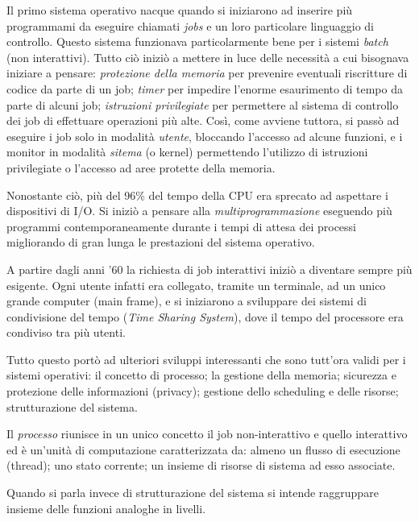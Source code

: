 Il primo sistema operativo nacque quando si iniziarono ad inserire più programmami da eseguire chiamati \textit{jobs} e un loro particolare linguaggio di controllo. Questo sistema funzionava particolarmente bene per i sistemi \textit{batch} (non interattivi). Tutto ciò iniziò a mettere in luce delle necessità a cui bisognava iniziare a pensare: \textit{protezione della memoria} per prevenire eventuali riscritture di codice da parte di un job; \textit{timer} per impedire l'enorme esaurimento di tempo da parte di alcuni job; \textit{istruzioni privilegiate} per permettere al sistema di controllo dei job di effettuare operazioni più alte. Così, come avviene tuttora, si passò ad eseguire i job solo in modalità \textit{utente}, bloccando l'accesso ad alcune funzioni, e i monitor in modalità \textit{sitema} (o kernel) permettendo l'utilizzo di istruzioni privilegiate o l'accesso ad aree protette della memoria.

Nonostante ciò, più del 96\% del tempo della CPU era sprecato ad aspettare i dispositivi di I/O. Si iniziò a pensare alla \textit{multiprogrammazione} eseguendo più programmi contemporaneamente durante i tempi di attesa dei processi migliorando di gran lunga le prestazioni del sistema operativo. 

A partire dagli anni '60 la richiesta di job interattivi iniziò a diventare sempre più esigente. Ogni utente infatti era collegato, tramite un terminale, ad un unico grande computer (main frame), e si iniziarono a sviluppare dei sistemi di condivisione del tempo (\textit{Time Sharing System}), dove il tempo del processore era condiviso tra più utenti.

Tutto questo portò ad ulteriori sviluppi interessanti che sono tutt'ora validi per i sistemi operativi: il concetto di processo; la gestione della memoria; sicurezza e protezione delle informazioni (privacy); gestione dello scheduling e delle risorse;
strutturazione del sistema.

Il \textit{processo} riunisce in un unico concetto il job non-interattivo e quello interattivo ed è un’unità di computazione caratterizzata da: almeno un flusso di esecuzione (thread); uno stato corrente; un insieme di risorse di sistema ad esso associate.

Quando si parla invece di strutturazione del sistema si intende raggruppare insieme delle funzioni analoghe in livelli.